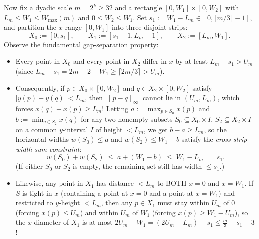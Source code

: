 \documentclass[11pt,reqno]{amsart}
\theoremstyle{plain}
\theoremstyle{definition}
\theoremstyle{remark}
\DeclareRobustCommand{\_}{\ifmmode\text{\textunderscore}\else\textunderscore\allowbreak\fi}
\begin{document}
Now fix a dyadic scale $m = 2^k \ge 32$ and a rectangle $[0, W_1] \times [0, W_2]$ with $L_m \le W_1 \le W_{\max}(m)$ and $0 \le W_2 \le W_1$. Set $s_1 := W_1 - L_m \in [0, \lfloor m/3 \rfloor - 1]$, and partition the $x$-range $[0, W_1]$ into three disjoint strips:
\[
  X_0 := [0, s_1], \qquad X_1 := [s_1 + 1, L_m - 1], \qquad X_2 := [L_m, W_1].
\]
Observe the fundamental gap-separation property:
\begin{itemize}[leftmargin=1.6em]
  \item Every point in $X_0$ and every point in $X_2$ differ in $x$ by at least $L_m - s_1 > U_m$ (since $L_m - s_1 = 2m - 2 - W_1 \ge \lceil 2m/3 \rceil > U_m$).
  \item Consequently, if $p \in X_0 \times [0, W_2]$ and $q \in X_2 \times [0, W_2]$ satisfy $|y(p) - y(q)| < L_m$, then $\|p - q\|_\infty$ cannot lie in $(U_m, L_m)$, which forces $x(q) - x(p) \ge L_m$! Letting $a := \max_{p \in S_0} x(p)$ and $b := \min_{q \in S_2} x(q)$ for any two nonempty subsets $S_0 \subseteq X_0 \times I$, $S_2 \subseteq X_2 \times I$ on a common $y$-interval $I$ of height $< L_m$, we get $b - a \ge L_m$, so the horizontal widths $w(S_0) \le a$ and $w(S_2) \le W_1 - b$ satisfy the \emph{cross-strip width sum constraint}:
  \begin{equation}\label{eq:strip-sum}
    w(S_0) + w(S_2) \;\le\; a + (W_1 - b) \;\le\; W_1 - L_m \;=\; s_1.
  \end{equation}
  (If either $S_0$ or $S_2$ is empty, the remaining set still has width $\le s_1$.)
  \item Likewise, any point in $X_1$ has distance $< L_m$ to BOTH $x = 0$ and $x = W_1$. If $S$ is tight in $x$ (containing a point at $x = 0$ and a point at $x = W_1$) and restricted to $y$-height $< L_m$, then any $p \in X_1$ must stay within $U_m$ of $0$ (forcing $x(p) \le U_m$) and within $U_m$ of $W_1$ (forcing $x(p) \ge W_1 - U_m$), so the $x$-diameter of $X_1$ is at most $2 U_m - W_1 = (2 U_m - L_m) - s_1 \le \frac{m}{3} - s_1 - 3$!
\end{itemize}
\end{document}
